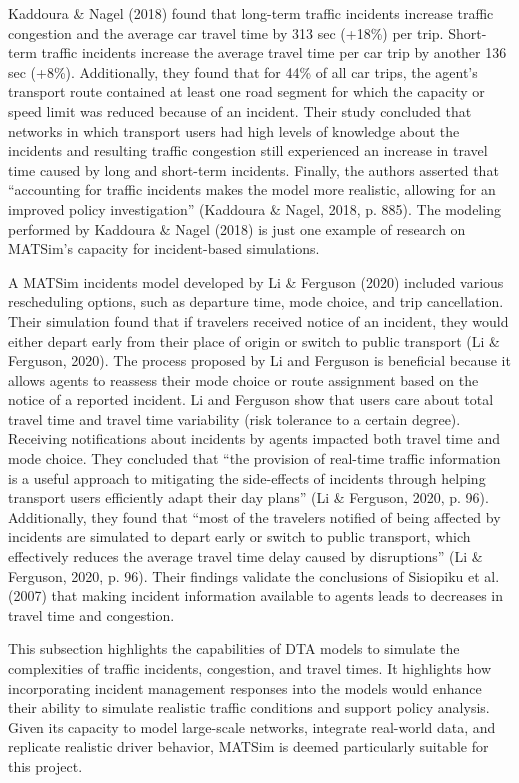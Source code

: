 \documentclass[fancy, oneside, mastersfancy, ms]{byuthesis}
\begin{document}
Kaddoura \& Nagel (2018) found that long-term traffic incidents increase
traffic congestion and the average car travel time by 313 sec (+18\%)
per trip. Short-term traffic incidents increase the average travel time
per car trip by another 136 sec (+8\%). Additionally, they found that
for 44\% of all car trips, the agent's transport route contained at
least one road segment for which the capacity or speed limit was reduced
because of an incident. Their study concluded that networks in which
transport users had high levels of knowledge about the incidents and
resulting traffic congestion still experienced an increase in travel
time caused by long and short-term incidents. Finally, the authors
asserted that ``accounting for traffic incidents makes the model more
realistic, allowing for an improved policy investigation'' (Kaddoura \&
Nagel, 2018, p. 885). The modeling performed by Kaddoura \& Nagel (2018)
is just one example of research on MATSim's capacity for incident-based
simulations.

A MATSim incidents model developed by Li \& Ferguson (2020) included
various rescheduling options, such as departure time, mode choice, and
trip cancellation. Their simulation found that if travelers received
notice of an incident, they would either depart early from their place
of origin or switch to public transport (Li \& Ferguson, 2020). The
process proposed by Li and Ferguson is beneficial because it allows
agents to reassess their mode choice or route assignment based on the
notice of a reported incident. Li and Ferguson show that users care
about total travel time and travel time variability (risk tolerance to a
certain degree). Receiving notifications about incidents by agents
impacted both travel time and mode choice. They concluded that ``the
provision of real-time traffic information is a useful approach to
mitigating the side-effects of incidents through helping transport users
efficiently adapt their day plans'' (Li \& Ferguson, 2020, p. 96).
Additionally, they found that ``most of the travelers notified of being
affected by incidents are simulated to depart early or switch to public
transport, which effectively reduces the average travel time delay
caused by disruptions'' (Li \& Ferguson, 2020, p. 96). Their findings
validate the conclusions of Sisiopiku et al. (2007) that making incident
information available to agents leads to decreases in travel time and
congestion.

This subsection highlights the capabilities of DTA models to simulate
the complexities of traffic incidents, congestion, and travel times. It
highlights how incorporating incident management responses into the
models would enhance their ability to simulate realistic traffic
conditions and support policy analysis. Given its capacity to model
large-scale networks, integrate real-world data, and replicate realistic
driver behavior, MATSim is deemed particularly suitable for this
project.
\end{document}
